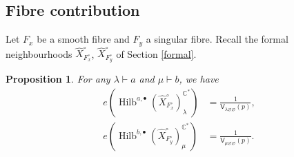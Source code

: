 \documentclass{amsart}
\newtheorem{proposition}[theorem]{Proposition}
\theoremstyle{definition}
\newcommand{\CC} {\mathbb{C}}          %
\newcommand{\sfV}{\mathsf{V}}
\newcommand{\Hilb}{\operatorname{Hilb}}
\begin{document}
\subsection{Fibre contribution}

Let $F_x$ be a smooth fibre and $F_y$ a singular fibre. Recall the formal neighbourhoods $\widehat{X}^{\circ}_{F_{x}^{\circ}}$,  $\widehat{X}^{\circ}_{F_{y}^{\circ}}$ of Section \ref{formal}.
\begin{proposition} \label{vertex2}
For any $\lambda \vdash a$ and $\mu \vdash b$, we have
\begin{align*}
e(\Hilb^{a,\bullet}(\widehat{X}^{\circ}_{F_{x}^{\circ}})_{\lambda}^{\CC^*}) &= \frac{1}{\sfV_{\lambda\varnothing\varnothing}(p)}, \\
e(\Hilb^{b,\bullet}(\widehat{X}^{\circ}_{F_{y}^{\circ}})_{\mu}^{\CC^*}) &= \frac{1}{\sfV_{\mu\varnothing\varnothing}(p)}.
\end{align*}
\end{proposition}
\end{document}
